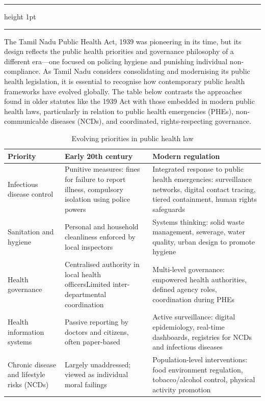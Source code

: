 \documentclass[a4paper,11pt]{article}
\newenvironment{floatintro}{\bigskip\footnotesize}{\bigskip}
\begin{document}
            \begin{table}[htbp]
        \hrule height 1pt\medskip
        \caption{Evolving priorities in public health law}
        \hrule

        \begin{floatintro}
            The Tamil Nadu Public Health Act, 1939 was pioneering in its time, but its design reflects the public health priorities and governance philosophy of a different era—one focused on policing hygiene and punishing individual non-compliance. As Tamil Nadu considers consolidating and modernising its public health legislation, it is essential to recognise how contemporary public health frameworks have evolved globally. The table below contrasts the approaches found in older statutes like the 1939 Act with those embedded in modern public health laws, particularly in relation to public health emergencies (PHEs), non-communicable diseases (NCDs), and coordinated, rights-respecting governance.
        \end{floatintro}
        \renewcommand{\arraystretch}{1.4} 
        \footnotesize\begin{center}
        \begin{tabular}{@{}p{2.6cm}p{4cm}p{4.7cm}@{}}
        \toprule
        \textbf{Priority} & \textbf{Early 20th century} & \textbf{Modern regulation} \\
        \midrule
        Infectious disease control & Punitive measures: fines for failure to report illness, compulsory isolation using police powers & Integrated response to public health emergencies: surveillance networks, digital contact tracing, tiered containment, human rights safeguards \\
        Sanitation and hygiene & Personal and household cleanliness enforced by local inspectors & Systems thinking: solid waste management, sewerage, water quality, urban design to promote hygiene \\
        Health governance & Centralised authority in local health officers\newline Limited inter-departmental coordination & Multi-level governance: empowered health authorities, defined agency roles, coordination during PHEs \\
        Health information systems & Passive reporting by doctors and citizens, often paper-based & Active surveillance: digital epidemiology, real-time dashboards, registries for NCDs and infectious diseases \\
        Chronic disease and lifestyle risks (NCDs) & Largely unaddressed; viewed as individual moral failings & Population-level interventions: food environment regulation, tobacco/alcohol control, physical activity promotion \\

\end{tabular}
\end{center}
\end{table}
\end{document}

